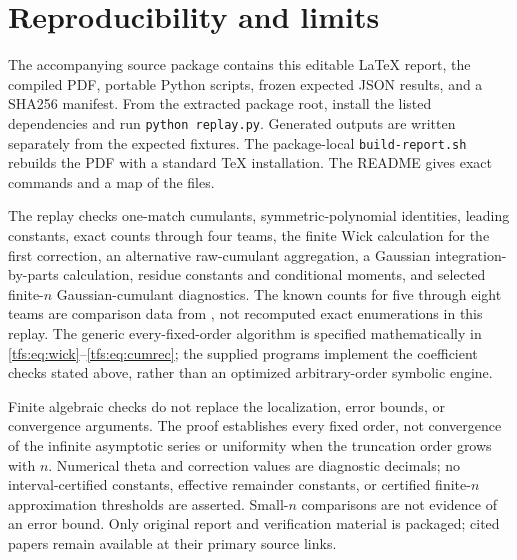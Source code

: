 \documentclass[11pt,a4paper]{article}
\numberwithin{equation}{section}
\theoremstyle{remark}
\newcommand{\1}{\mathbf 1}
\begin{document}
\section{Reproducibility and limits}\label{tfs:sec:replay}
The accompanying source package contains this editable LaTeX report,
the compiled PDF, portable Python scripts, frozen expected JSON results,
and a SHA256 manifest. From the extracted package root, install the
listed dependencies and run \texttt{python replay.py}. Generated outputs
are written separately from the expected fixtures. The package-local
\texttt{build-report.sh} rebuilds the PDF with a standard TeX installation.
The README gives exact commands and a map of the files.

The replay checks one-match cumulants, symmetric-polynomial identities,
leading constants, exact counts through four teams, the finite Wick
calculation for the first correction, an alternative raw-cumulant
aggregation, a Gaussian integration-by-parts calculation, residue
constants and conditional moments, and selected finite-$n$
Gaussian-cumulant diagnostics.
The known counts for five through eight teams are comparison data from
\cite{football,oeis}, not recomputed exact enumerations in this replay.
The generic every-fixed-order algorithm is specified mathematically in
\eqref{tfs:eq:wick}--\eqref{tfs:eq:cumrec}; the supplied programs implement the
coefficient checks stated above, rather than an optimized arbitrary-order
symbolic engine.

Finite algebraic checks do not replace the localization, error bounds,
or convergence arguments. The proof establishes every fixed order, not
convergence of the infinite asymptotic series or uniformity when the
truncation order grows with $n$. Numerical theta and correction values
are diagnostic decimals; no interval-certified constants, effective
remainder constants, or certified finite-$n$ approximation thresholds
are asserted. Small-$n$ comparisons are not evidence of an error bound.
Only original report and verification material is packaged; cited papers
remain available at their primary source links.
\end{document}

